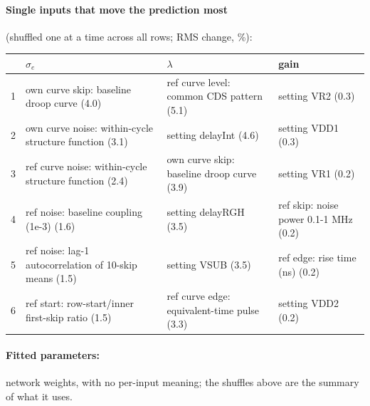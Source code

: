 \paragraph{Single inputs that move the prediction most} (shuffled one at a time across all rows; RMS change, \%):
\begin{center}\footnotesize
\begin{tabular}{rp{}p{}p{}}
\toprule
 & $\sigma_e$ & $\lambda$ & gain \\
\midrule
1 & own curve skip: baseline droop curve (4.0) & ref curve level: common CDS pattern (5.1) & setting VR2 (0.3) \\
2 & own curve noise: within-cycle structure function (3.1) & setting delayInt (4.6) & setting VDD1 (0.3) \\
3 & ref curve noise: within-cycle structure function (2.4) & own curve skip: baseline droop curve (3.9) & setting VR1 (0.2) \\
4 & ref noise: baseline coupling (1e-3) (1.6) & setting delayRGH (3.5) & ref skip: noise power 0.1-1 MHz (0.2) \\
5 & ref noise: lag-1 autocorrelation of 10-skip means (1.5) & setting VSUB (3.5) & ref edge: rise time (ns) (0.2) \\
6 & ref start: row-start/inner first-skip ratio (1.5) & ref curve edge: equivalent-time pulse (3.3) & setting VDD2 (0.2) \\
\bottomrule
\end{tabular}
\end{center}
\paragraph{Fitted parameters:} network weights, with no per-input meaning; the shuffles above are the summary of what it uses.
